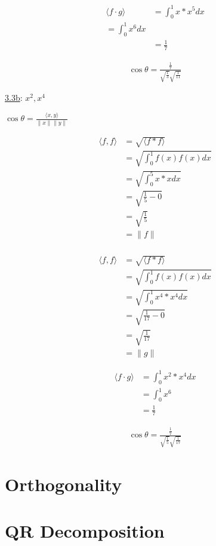 \documentclass{article}
\begin{document}
\begin{equation}
  \begin{split}
  \langle f \cdot g \rangle & = \int_{0}^{1} x * x^5 dx\\
   = \int_{0}^{1}x^6 dx\\
  & = \frac{1}{7}
  \end{split}
\end{equation}

\begin{equation}
  \begin{split}
  \cos \theta = \frac{\frac{1}{7}}{\sqrt{\frac{1}{3}}\sqrt{\frac{1}{11}}}
  \end{split}
\end{equation}

\underline{3.3b}: $x^2, x^4$

$\cos\theta =\frac{\langle x,y \rangle}{ \| x\| \|y\|} $

\begin{equation}
  \begin{split}
  \langle f,f \rangle & = \sqrt{\langle f * f \rangle}\\
  & = \sqrt{\int_{0}^{1} f(x)f(x) dx}\\
  & = \sqrt{\int_{0}^{5} x * x dx}\\
  & = \sqrt{\frac{1}{5} - 0}\\
  & = \sqrt{\frac{1}{5}}\\
  & = \| f \|\\
  \end{split}
\end{equation}

\begin{equation}
  \begin{split}
  \langle f,f \rangle & = \sqrt{\langle f * f \rangle}\\
  & = \sqrt{\int_{0}^{1} f(x)f(x) dx}\\
  & = \sqrt{\int_{0}^{1} x^{4} * x^{4} dx}\\
  & = \sqrt{\frac{1}{17} - 0}\\
  & = \sqrt{\frac{1}{17}} \\
  & = \| g \|
  \end{split}
\end{equation}

\begin{equation}
  \begin{split}
  \langle f \cdot g \rangle & =\int_{0}^{1} x^2 * x^4 dx \\
  & = \int_{0}^{1} x^6 \\
  & = \frac{1}{7}
  \end{split}
\end{equation}

\begin{equation}
  \begin{split}
  \cos \theta = \frac{\frac{1}{7}}{\sqrt{\frac{1}{5}}\sqrt{\frac{1}{17}}}
  \end{split}
\end{equation}

\section{Orthogonality}

\section{QR Decomposition}
\end{document}

